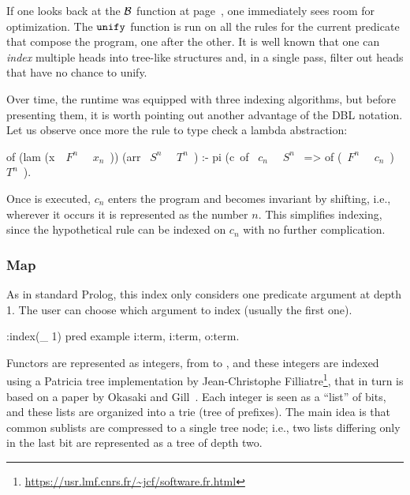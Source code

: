 \documentclass[a4paper, 11pt]{book}
\begin{document}
If one looks back at the $\mathcal{B}$ function at page~\pageref{backchain},
one immediately sees room for optimization. The $\texttt{unify}$ function is
run on all the rules for the current predicate that compose the program,
one after the other. It is well known that one can \emph{index} multiple heads
into tree-like structures and, in a single pass, filter out heads that have
no chance to unify.

Over time, the runtime was equipped with three indexing algorithms, but before
presenting them, it is worth pointing out another advantage of the DBL
notation. Let us observe once more the rule to type check a lambda abstraction:

\begin{elpicode}
of (lam (x\ ~$F^n$~ ~$x_n$~)) (arr ~$S^n$~ ~$T^n$~) :-
  pi (c\ of ~$c_n$~ ~$S^n$~ => of (~$F^n$~ ~$c_n$~) ~$T^n$~).
\end{elpicode}

\noindent
Once  is executed, $c_n$ enters the program and becomes invariant by
shifting, i.e., wherever it occurs it is represented as the number $n$. This
simplifies indexing, since the hypothetical rule 
can be indexed on $c_n$ with no further complication.

\subsubsection{Map}


As in standard Prolog, this index only considers one predicate argument at
depth 1. The user can choose which argument to index (usually the first one).

\begin{elpicode}
:index(_ 1) %
pred example i:term, i:term, o:term.
\end{elpicode}

\noindent
Functors are represented as integers, from  to , and
these integers are indexed using a Patricia tree implementation by
Jean-Christophe Filliatre\footnote{\url{https://usr.lmf.cnrs.fr/~jcf/software.fr.html}},
that in turn is based on a paper by Okasaki and Gill~\cite{Okasaki:98:IntMap}.
Each integer is
seen as a ``list'' of bits, and these lists are organized into a trie (tree of
prefixes). The main idea is that common sublists are compressed to a single
tree node; i.e., two lists differing only in the last bit are represented as a
tree of depth two.
\end{document}
